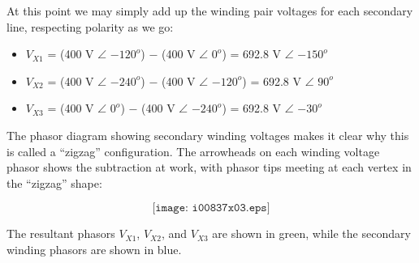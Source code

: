 \vskip 10pt

At this point we may simply add up the winding pair voltages for each secondary line, respecting polarity as we go:

\begin{itemize}
\item{} $V_{X1}$ = (400 V $\angle$ $-120^{o}$) $-$ (400 V $\angle$ $0^{o}$) = 692.8 V $\angle$ $-150^{o}$
\item{} $V_{X2}$ = (400 V $\angle$ $-240^{o}$) $-$ (400 V $\angle$ $-120^{o}$) = 692.8 V $\angle$ $90^o$
\item{} $V_{X3}$ = (400 V $\angle$ $0^{o}$) $-$ (400 V $\angle$ $-240^{o}$) = 692.8 V $\angle$ $-30^o$
\end{itemize}

\filbreak

The phasor diagram showing secondary winding voltages makes it clear why this is called a ``zigzag'' configuration.  The arrowheads on each winding voltage phasor shows the subtraction at work, with phasor tips meeting at each vertex in the ``zigzag'' shape:

$$\texttt{[image: i00837x03.eps]}$$

The resultant phasors $V_{X1}$, $V_{X2}$, and $V_{X3}$ are shown in green, while the secondary winding phasors are shown in blue.



